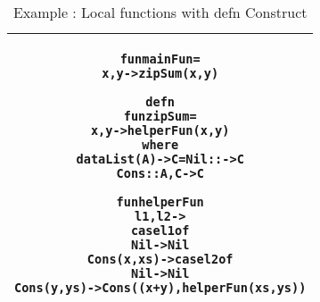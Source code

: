 \documentclass[11pt]{article}
\begin{document}
\begin{table}[h!]
\begin{center}
\begin{tabular}{|c|} \hline
\begin{minipage}{5in}
\begin{alltt}


  fun mainFun = 
      x,y -> zipSum(x,y)
  
  defn
    fun zipSum =
      x,y -> helperFun (x,y)
  where 
    data List(A) -> C = Nil  ::     -> C
                        Cons :: A,C -> C 

    fun helperFun 
      l1,l2 ->
        case l1 of 
          Nil -> Nil
          Cons(x,xs) -> case l2 of
                          Nil -> Nil
                          Cons(y,ys) -> Cons((x+y),helperFun(xs,ys))

\end{alltt} 
\end {minipage} 
\tabularnewline
\hline
\end{tabular}
\caption{Example : Local functions with {\sf defn} Construct}
\label{lam:defnExample}
\end{center}
\end{table}
\end{document}
